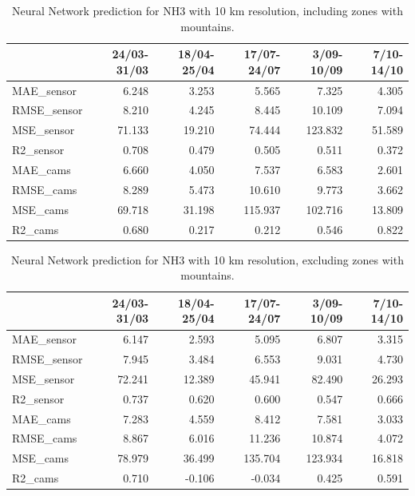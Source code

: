 \begin{table}[H]
\begin{tabular}{lrrrrr}
\toprule
 &  24/03-31/03 &  18/04-25/04 &  17/07-24/07 &  3/09-10/09 &  7/10-14/10 \\
\midrule
 MAE\_sensor &        6.248 &        3.253 &        5.565 &       7.325 &       4.305 \\
RMSE\_sensor &        8.210 &        4.245 &        8.445 &      10.109 &       7.094 \\
 MSE\_sensor &       71.133 &       19.210 &       74.444 &     123.832 &      51.589 \\
  R2\_sensor &        0.708 &        0.479 &        0.505 &       0.511 &       0.372 \\
   MAE\_cams &        6.660 &        4.050 &        7.537 &       6.583 &       2.601 \\
  RMSE\_cams &        8.289 &        5.473 &       10.610 &       9.773 &       3.662 \\
   MSE\_cams &       69.718 &       31.198 &      115.937 &     102.716 &      13.809 \\
    R2\_cams &        0.680 &        0.217 &        0.212 &       0.546 &       0.822 \\
\bottomrule
\end{tabular}
\caption{Neural Network prediction for NH3 with 10 km resolution, including zones with mountains.}
\end{table}
\begin{table}[H]
\begin{tabular}{lrrrrr}
\toprule
 &  24/03-31/03 &  18/04-25/04 &  17/07-24/07 &  3/09-10/09 &  7/10-14/10 \\
\midrule
 MAE\_sensor &        6.147 &        2.593 &        5.095 &       6.807 &       3.315 \\
RMSE\_sensor &        7.945 &        3.484 &        6.553 &       9.031 &       4.730 \\
 MSE\_sensor &       72.241 &       12.389 &       45.941 &      82.490 &      26.293 \\
  R2\_sensor &        0.737 &        0.620 &        0.600 &       0.547 &       0.666 \\
   MAE\_cams &        7.283 &        4.559 &        8.412 &       7.581 &       3.033 \\
  RMSE\_cams &        8.867 &        6.016 &       11.236 &      10.874 &       4.072 \\
   MSE\_cams &       78.979 &       36.499 &      135.704 &     123.934 &      16.818 \\
    R2\_cams &        0.710 &       -0.106 &       -0.034 &       0.425 &       0.591 \\
\bottomrule
\end{tabular}
\caption{Neural Network prediction for NH3 with 10 km resolution, excluding zones with mountains.}
\end{table}

